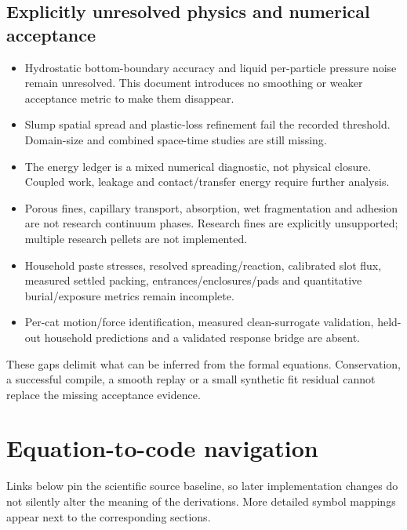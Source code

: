 \documentclass[11pt,a4paper]{article}
\numberwithin{equation}{section}
\begin{document}
\subsection{Explicitly unresolved physics and numerical acceptance}
\begin{itemize}
 \item Hydrostatic bottom-boundary accuracy and liquid per-particle pressure
 noise remain unresolved. This document introduces no smoothing or weaker
 acceptance metric to make them disappear.
 \item Slump spatial spread and plastic-loss refinement fail the recorded
 threshold. Domain-size and combined space-time studies are still missing.
 \item The energy ledger is a mixed numerical diagnostic, not physical closure.
 Coupled work, leakage and contact/transfer energy require further analysis.
 \item Porous fines, capillary transport, absorption, wet fragmentation and
 adhesion are not research continuum phases. Research fines are explicitly
 unsupported; multiple research pellets are not implemented.
 \item Household paste stresses, resolved spreading/reaction, calibrated slot
 flux, measured settled packing, entrances/enclosures/pads and quantitative
 burial/exposure metrics remain incomplete.
 \item Per-cat motion/force identification, measured clean-surrogate validation,
 held-out household predictions and a validated response bridge are absent.
\end{itemize}
These gaps delimit what can be inferred from the formal equations. Conservation,
a successful compile, a smooth replay or a small synthetic fit residual cannot
replace the missing acceptance evidence.

\clearpage
\appendix
\section{Equation-to-code navigation}
Links below pin the scientific source baseline, so later implementation changes
do not silently alter the meaning of the derivations. More detailed symbol
mappings appear next to the corresponding sections.
\end{document}
